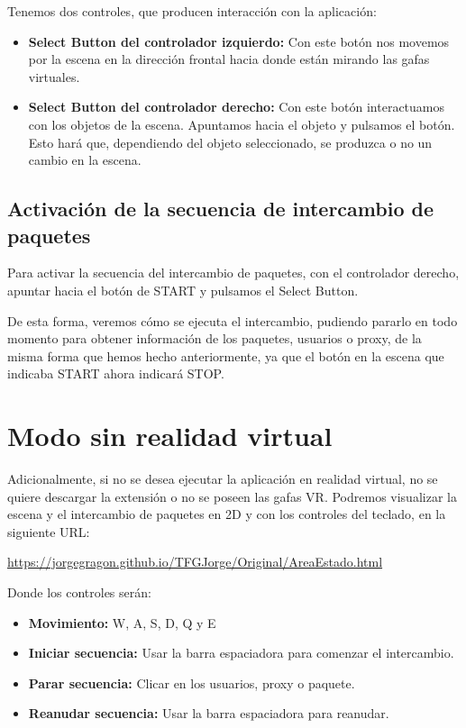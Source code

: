 \documentclass[a4paper, 12pt]{book}
\begin{document}
Tenemos dos controles, que producen interacción con la aplicación:
\begin{itemize}
  \item \textbf{Select Button del controlador izquierdo:} Con este botón nos movemos por la escena en la dirección frontal hacia donde están mirando las gafas virtuales.
  \item \textbf{Select Button del controlador derecho:} Con este botón interactuamos con los objetos de la escena. Apuntamos 
  hacia el objeto y pulsamos el botón. Esto hará que, dependiendo del 
  objeto seleccionado, se produzca o no un cambio en la escena.
\end{itemize}

\subsection{Activación de la secuencia de intercambio de paquetes}
Para activar la secuencia del intercambio de paquetes, con el controlador derecho, 
apuntar hacia el botón de START y pulsamos el Select Button.

De esta forma, veremos cómo se ejecuta el intercambio, pudiendo pararlo en todo 
momento para obtener información de los paquetes, usuarios o proxy, de la misma 
forma que hemos
hecho anteriormente, ya que el botón en la escena que indicaba START ahora 
indicará STOP.

\section{Modo sin realidad virtual}
Adicionalmente, si no se desea ejecutar la aplicación en realidad virtual, no se quiere descargar la extensión o no se poseen las gafas VR.
Podremos visualizar la escena y el intercambio de paquetes en 2D y con los controles del teclado, en la siguiente URL:

\url{https://jorgegragon.github.io/TFGJorge/Original/AreaEstado.html}

Donde los controles serán:

\begin{itemize}
  \item \textbf{Movimiento:} W, A, S, D, Q y E
  \item \textbf{Iniciar secuencia:} Usar la barra espaciadora para comenzar el intercambio.
  \item \textbf{Parar secuencia:} Clicar en los usuarios, proxy o paquete.
  \item \textbf{Reanudar secuencia:} Usar la barra espaciadora para reanudar.
\end{itemize}

\cleardoublepage


 
~\cite{Ejemplos_Three.js}
~\cite{webXR}
~\cite{Using_a_WebXR_controller_using_Three.JS}
~\cite{Aframe:Supermedium}
\end{document}
